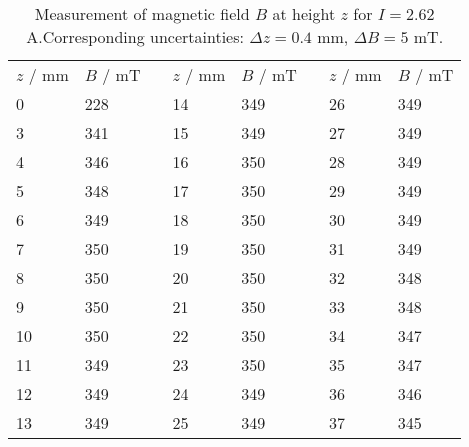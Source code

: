 \begin{table}[htdp]
\centering
    \begin{tabular}{|p{1.34cm}|p{2.16cm}|p{0.8cm}|p{1.34cm}|p{2.16cm}|p{0.8cm}|p{1.34cm}|p{2.16cm}|}
        \cline{1-2}\cline{4-5}\cline{7-8}
        $z$ / mm \cellcolor{LightCyan}& $B$ / mT \cellcolor{LightCyan}&&
        $z$ / mm \cellcolor{LightCyan}& $B$ / mT \cellcolor{LightCyan}&&
        $z$ / mm \cellcolor{LightCyan}& $B$ / mT \cellcolor{LightCyan}\\ 
        \cline{1-2}\cline{4-5}\cline{7-8}
        0 & 228 &&14 & 349 &&26 & 349 \\ 
        3 & 341 &&15 & 349 &&27 & 349 \\ 
        4 & 346 &&16 & 350 &&28 & 349 \\ 
        5 & 348 &&17 & 350 &&29 & 349 \\ 
        6 & 349 &&18 & 350 &&30 & 349 \\ 
        7 & 350 &&19 & 350 &&31 & 349 \\ 
        8 & 350 &&20 & 350 &&32 & 348 \\ 
        9 & 350 &&21 & 350 &&33 & 348 \\ 
        10 & 350 &&22 & 350 &&34 & 347 \\ 
        11 & 349 &&23 & 350 &&35 & 347 \\ 
        12 & 349 &&24 & 349 &&36 & 346 \\ 
        13 & 349 &&25 & 349 &&37 & 345 \\ 
        \cline{1-2}\cline{4-5}\cline{7-8}
    \end{tabular}
    \caption{
        Measurement of magnetic field $B$ at height $z$ for $I = 2.62$ A.Corresponding uncertainties: $\Delta z = 0.4$ mm, $\Delta B = 5$ mT.
        }
    \label{tab:b_height}
\end{table}
